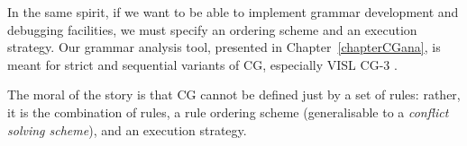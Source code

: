 In the same spirit, if we want to be able to implement grammar development and debugging facilities, we must specify an ordering scheme and an execution strategy. 
Our grammar analysis tool, presented in Chapter~\ref{chapterCGana}, 
is meant for strict and sequential variants of CG, especially VISL CG-3 \cite{vislcg3}. 

The moral of the story is that CG cannot be defined just by a set of rules: 
rather, it is the combination of rules, a rule ordering scheme (generalisable to a \emph{conflict solving scheme}), and an execution strategy. 



 








